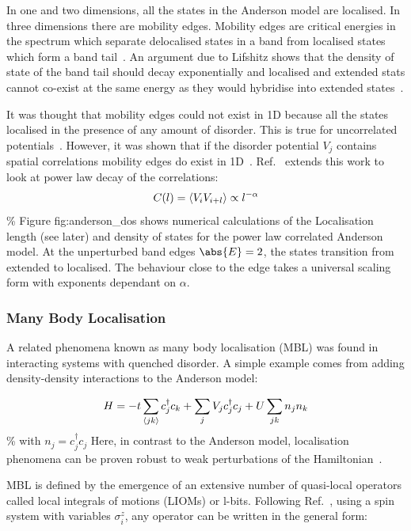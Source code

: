 In one and two dimensions, all the states in the Anderson model are localised. In three dimensions there are mobility edges. Mobility edges are critical energies in the spectrum which separate delocalised states in a band from localised states which form a band tail~\autocite{abaninRecentProgressManybody2017}. An argument due to Lifshitz shows that the density of state of the band tail should decay exponentially and localised and extended stats cannot co-exist at the same energy as they would hybridise into extended states~\autocite{kramerLocalizationTheoryExperiment1993}.

It was thought that mobility edges could not exist in 1D because all the states localised in the presence of any amount of disorder. This is true for uncorrelated potentials~\autocite{goldshteinPurePointSpectrum1977}. However, it was shown that if the disorder potential \(V_j\) contains spatial correlations mobility edges do exist in 1D~\autocite{izrailevLocalizationMobilityEdge1999,izrailevAnomalousLocalizationLowDimensional2012}. Ref.~\autocite{croyAndersonLocalization1D2011} extends this work to look at power law decay of the correlations: \[ C(l) = \langle V_i V_{i+l} \rangle \propto l^{-\alpha} \] \% Figure fig:anderson\_dos shows numerical calculations of the Localisation length (see later) and density of states for the power law correlated Anderson model. At the unperturbed band edges \(\abs{E} = 2\), the states transition from extended to localised. The behaviour close to the edge takes a universal scaling form with exponents dependant on \(\alpha\).

\hypertarget{many-body-localisation}{%
\subsubsection{Many Body Localisation}\label{many-body-localisation}}

A related phenomena known as many body localisation (MBL) was found in interacting systems with quenched disorder. A simple example comes from adding density-density interactions to the Anderson model:

\[
H = -t\sum_{\langle jk \rangle} c^\dagger_j c_k + \sum_j V_j c_j^\dagger c_j + U\sum_{jk} n_j n_k
\] \% with \(n_j = c^\dagger_j c_j\) Here, in contrast to the Anderson model, localisation phenomena can be proven robust to weak perturbations of the Hamiltonian~\autocite{imbrieManyBodyLocalizationQuantum2016}.

MBL is defined by the emergence of an extensive number of quasi-local operators called local integrals of motions (LIOMs) or l-bits. Following Ref.~\autocite{abaninRecentProgressManybody2017}, using a spin system with variables \(\sigma^z_i\), any operator can be written in the general form:

